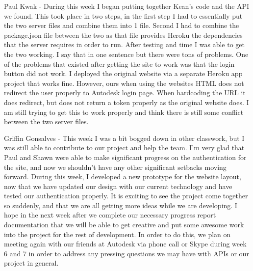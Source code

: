 \documentclass[10pt,draftclsnofoot,onecolumn]{IEEEtran}
\begin{document}
Paul Kwak - During this week I began putting together Kean's code and the API we found. This took place in two steps, in the first step I had to essentially put the two server files and combine them into 1 file. Second I had to combine the package.json file between the two as that file provides Heroku the dependencies that the server requires in order to run. After testing and time I was able to get the two working. I say that in one sentence but there were tons of problems. One of the problems that existed after getting the site to work was that the login button did not work. I deployed the original website via a separate Heroku app project that works fine. However, ours when using the websites HTML does not redirect the user properly to Autodesk login page. When hardcoding the URL it does redirect, but does not return a token properly as the original website does. I am still trying to get this to work properly and think there is still some conflict between the two server files.

Griffin Gonsalves - This week I was a bit bogged down in other classwork, but I was still able to contribute to our project and help the team. I'm very glad that Paul and Shawn were able to make significant progress on the authentication for the site, and now we shouldn't have any other significant setbacks moving forward. During this week, I developed a new prototype for the website layout, now that we have updated our design with our current technology and have tested our authentication properly. It is exciting to see the project come together so suddenly, and that we are all getting more ideas while we are developing. I hope in the next week after we complete our necessary progress report documentation that we will be able to get creative and put some awesome work into the project for the rest of development. In order to do this, we plan on meeting again with our friends at Autodesk via phone call or Skype during week 6 and 7 in order to address any pressing questions we may have with APIs or our project in general.
\end{document}
